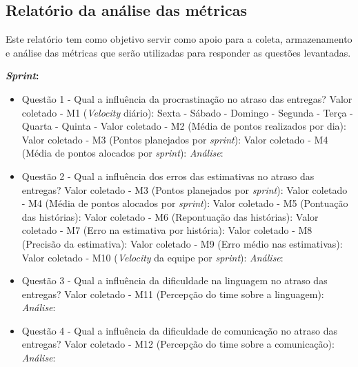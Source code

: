 \begin{apendicesenv}
    
    
        	
      	
      	
  \chapter{Relatório da análise das métricas}
  
  Este relatório tem como objetivo servir como apoio para a coleta, armazenamento e análise das métricas que serão 
  utilizadas para responder as questões levantadas.
  
  \textbf{\textit{Sprint}: \underline{ }\underline{ }\underline{ }}
  
  \begin{itemize}
    
    \item Questão 1 - Qual a influência da procrastinação no atraso das entregas?
      \subitem Valor coletado - M1 (\textit{Velocity} diário):
	\subsubitem Sexta -
	\subsubitem Sábado -
	\subsubitem Domingo -
	\subsubitem Segunda -
	\subsubitem Terça -
	\subsubitem Quarta -
	\subsubitem Quinta -
      \subitem Valor coletado - M2 (Média de pontos realizados por dia): 
      \subitem Valor coletado - M3 (Pontos planejados por \textit{sprint}):
      \subitem Valor coletado - M4 (Média de pontos alocados por \textit{sprint}):
      \subitem \textit{Análise}:

    \item Questão 2 - Qual a influência dos erros das estimativas no atraso das entregas? 
      \subitem Valor coletado - M3 (Pontos planejados por \textit{sprint}):
      \subitem Valor coletado - M4 (Média de pontos alocados por \textit{sprint}):
      \subitem Valor coletado - M5 (Pontuação das histórias):  
      \subitem Valor coletado - M6 (Repontuação das histórias): 
      \subitem Valor coletado - M7 (Erro na estimativa por história):
      \subitem Valor coletado - M8 (Precisão da estimativa):
      \subitem Valor coletado - M9 (Erro médio nas estimativas):
      \subitem Valor coletado - M10 (\textit{Velocity} da equipe por \textit{sprint}):
      \subitem \textit{Análise}:
      
    \item Questão 3 - Qual a influência da dificuldade na linguagem no atraso das entregas?
      \subitem Valor coletado - M11 (Percepção do time sobre a linguagem):
      \subitem \textit{Análise}:
    
    \item Questão 4 - Qual a influência da dificuldade de comunicação no atraso das entregas?
      \subitem Valor coletado - M12 (Percepção do time sobre a comunicação):
      \subitem \textit{Análise}:

  \end{itemize}

\end{apendicesenv}
